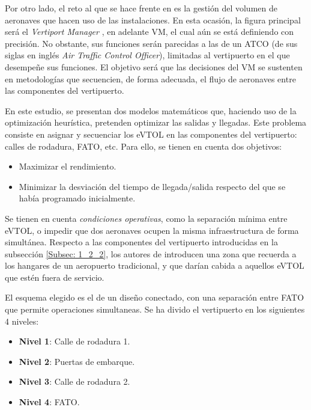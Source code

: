 \documentclass[12pt,a4paper]{book}
\begin{document}
Por otro lado, el reto al que se hace frente en \cite{espejo-diaz_heuristic_2023} es la gestión del volumen de aeronaves que hacen uso de las instalaciones. En esta ocasión, la figura principal será el \textsl{Vertiport Manager} \cite{proyEUREKA}, en adelante VM, el cual aún se está definiendo con precisión. No obstante, sus funciones serán parecidas a las de un ATCO (de sus siglas en inglés \textsl{Air Traffic Control Officer}), limitadas al vertipuerto en el que desempeñe sus funciones. El objetivo será que las decisiones del VM se sustenten en metodologías que secuencien, de forma adecuada, el flujo de aeronaves entre las componentes del vertipuerto.

En este estudio, se presentan dos modelos matemáticos que, haciendo uso de la optimización heurística, pretenden optimizar las salidas y llegadas. Este problema consiste en asignar y secuenciar los eVTOL en las componentes del vertipuerto: calles de rodadura, FATO, etc. Para ello, se tienen en cuenta dos objetivos: 
\begin{itemize}
	\item Maximizar el rendimiento. 
	\item Minimizar la desviación del tiempo de llegada/salida respecto del que se había programado inicialmente.
\end{itemize} 
Se tienen en cuenta \textsl{condiciones operativas}, como la separación mínima entre eVTOL, o impedir que dos aeronaves ocupen la misma infraestructura de forma simultánea. Respecto a las componentes del vertipuerto introducidas en la subsección \ref{Subsec: 1_2_2}, los autores de \cite{espejo-diaz_heuristic_2023} introducen una zona que recuerda a los hangares de un aeropuerto tradicional, y que darían cabida a aquellos eVTOL que estén fuera de servicio. 

El esquema elegido es el de un diseño conectado, con una separación entre FATO que permite operaciones simultaneas. Se ha divido el vertipuerto en los siguientes 4 niveles: 
\begin{itemize}
	\item \textbf{Nivel 1}: Calle de rodadura 1.
	\item \textbf{Nivel 2}: Puertas de embarque. 
	\item \textbf{Nivel 3}: Calle de rodadura 2. 
	\item \textbf{Nivel 4}: FATO.
\end{itemize}
\end{document}
